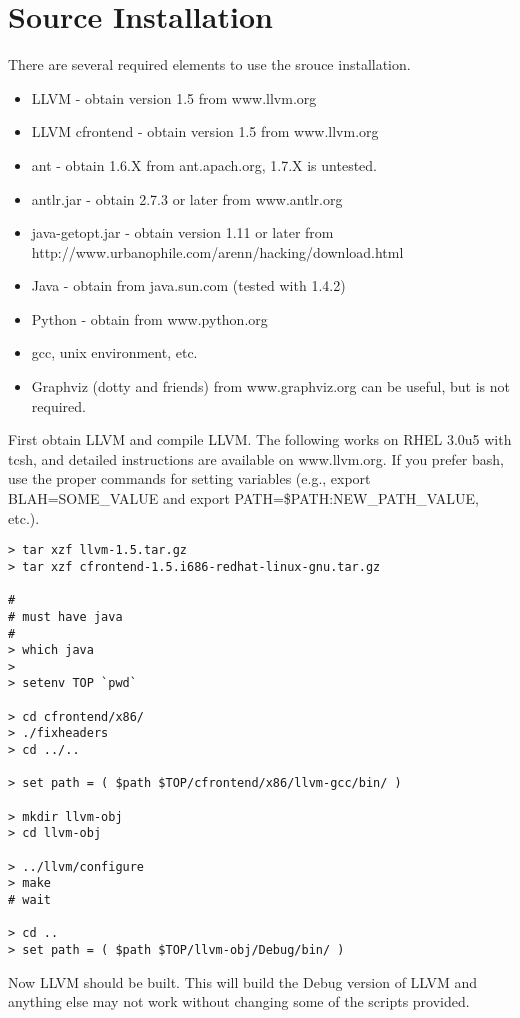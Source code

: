 \section{Source Installation}
There are several required elements to use the srouce installation.

\begin{itemize}
\item LLVM - obtain version 1.5 from www.llvm.org
\item LLVM cfrontend - obtain version 1.5 from www.llvm.org
\item ant - obtain 1.6.X from ant.apach.org, 1.7.X is untested.
\item antlr.jar - obtain 2.7.3 or later from www.antlr.org
\item java-getopt.jar - obtain version 1.11 or later from \\
http://www.urbanophile.com/arenn/hacking/download.html
\item Java - obtain from java.sun.com (tested with 1.4.2)
\item Python - obtain from www.python.org
\item gcc, unix environment, etc.
\item Graphviz (dotty and friends) from www.graphviz.org can be useful, but is not required.
\end{itemize}

First obtain LLVM and compile LLVM.  The following works on RHEL 3.0u5
with tcsh, and detailed instructions are available on www.llvm.org.
If you prefer bash, use the proper commands for setting variables
(e.g., export BLAH=SOME\_VALUE and export
PATH=\$PATH:NEW\_PATH\_VALUE, etc.).

\begin{verbatim}
> tar xzf llvm-1.5.tar.gz
> tar xzf cfrontend-1.5.i686-redhat-linux-gnu.tar.gz

#
# must have java
#
> which java
>
> setenv TOP `pwd`

> cd cfrontend/x86/
> ./fixheaders
> cd ../..

> set path = ( $path $TOP/cfrontend/x86/llvm-gcc/bin/ )

> mkdir llvm-obj
> cd llvm-obj

> ../llvm/configure
> make
# wait 

> cd ..
> set path = ( $path $TOP/llvm-obj/Debug/bin/ )

\end{verbatim}

Now LLVM should be built.  This will build the Debug version of LLVM
and anything else may not work without changing some of the scripts
provided.

